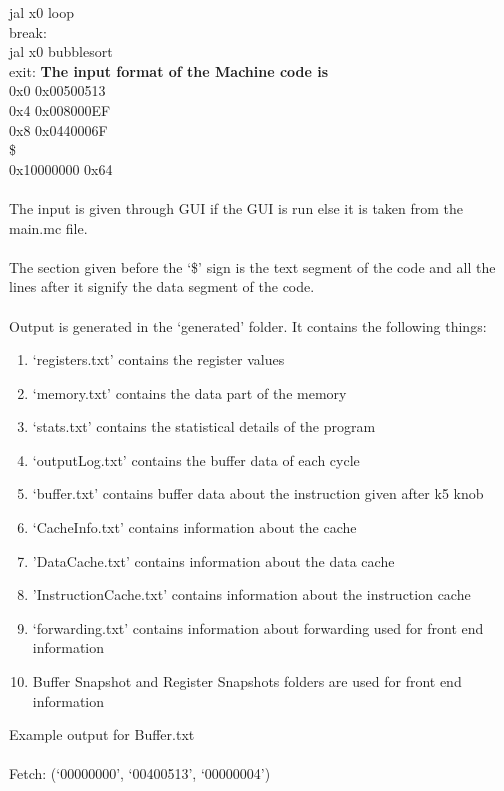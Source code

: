\documentclass{article}
\begin{document}
jal x0 loop\\
break:\\
jal x0 bubblesort\\
exit:
\newpage
{\bf The input format of the Machine code is}\\
0x0 0x00500513\\
0x4 0x008000EF\\
0x8 0x0440006F\\
\$\\
0x10000000 0x64\\\\
The input is given through GUI if the GUI is run else it is taken from the main.mc file.\\\\
The section given before the `\$' sign is the text segment of the code and all the lines after it signify the data segment of the code.\\\\
Output is generated in the `generated' folder. It contains the following things:  \\
\begin{enumerate}
    \item `registers.txt' contains the register values
    \item `memory.txt' contains the data part of the memory
    \item `stats.txt' contains the statistical details of the program
    \item `outputLog.txt' contains the buffer data of each cycle
    \item `buffer.txt' contains buffer data about the instruction given after k5 knob
    \item `CacheInfo.txt' contains information about the cache
    \item 'DataCache.txt' contains information about the data cache
    \item 'InstructionCache.txt' contains information about the instruction cache
    \item `forwarding.txt' contains information about forwarding used for front end information
    \item Buffer Snapshot and Register Snapshots folders are used for front end information
    
\end{enumerate}
\newpage
Example output for Buffer.txt\\\\
Fetch: (`00000000', `00400513', `00000004') \\
\end{document}
